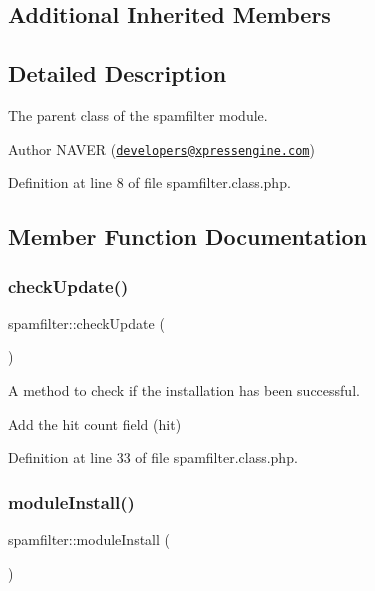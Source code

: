 \subsection*{Additional Inherited Members}


\subsection{Detailed Description}
The parent class of the spamfilter module. 

\begin{DoxyAuthor}{Author}
N\+A\+V\+ER (\href{mailto:developers@xpressengine.com}{\tt developers@xpressengine.\+com}) 
\end{DoxyAuthor}


Definition at line 8 of file spamfilter.\+class.\+php.



\subsection{Member Function Documentation}
\mbox{\label{classspamfilter_a4188af3ccfed17cb4da4a34f7931101e}} 
\subsubsection{\texorpdfstring{check\+Update()}{checkUpdate()}}
{\footnotesize\ttfamily spamfilter\+::check\+Update (\begin{DoxyParamCaption}{ }\end{DoxyParamCaption})}



A method to check if the installation has been successful. 

Add the hit count field (hit)

Definition at line 33 of file spamfilter.\+class.\+php.

\mbox{\label{classspamfilter_a954acbd202a4fd956703c0b212589392}} 
\subsubsection{\texorpdfstring{module\+Install()}{moduleInstall()}}
{\footnotesize\ttfamily spamfilter\+::module\+Install (\begin{DoxyParamCaption}{ }\end{DoxyParamCaption})}



